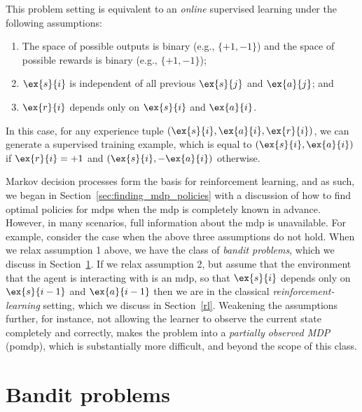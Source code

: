 This problem setting is equivalent to an {\em online} supervised
learning under the following assumptions:
\begin{enumerate}
\item The space of possible outputs is binary
(e.g., $\{+1, -1\}$) and the space of possible rewards is binary
(e.g., $\{+1, -1\}$); 
\item $\ex{s}{i}$ is independent of all previous $\ex{s}{j}$ and
  $\ex{a}{j}$; and
\item $\ex{r}{i}$ depends only on $\ex{s}{i}$ and $\ex{a}{i}$.  
\end{enumerate}
In this
case, for any experience tuple $(\ex{s}{i}, \ex{a}{i}, \ex{r}{i})$, we
can generate a supervised training example, which is equal to
$(\ex{s}{i}, \ex{a}{i})$ if $\ex{r}{i} = +1$ and $(\ex{s}{i},
-\ex{a}{i})$ otherwise.

Markov decision processes form the basis for reinforcement learning,
and as such, we began in Section~\ref{sec:finding_mdp_policies} with a
discussion of how to find optimal policies for {\sc mdp}s when the
{\sc mdp} is completely known in advance.  However, in many
scenarios, full information about the
{\sc mdp} is unavailable.  For example, consider the case when the above
three assumptions do not hold.  When we relax assumption 1 above, we
have the class of {\em bandit problems}, which we discuss in
Section~\ref{bandit}.  If we relax assumption 2, but assume that the
environment that the agent is interacting with is an {\sc mdp}, so
that $\ex{s}{i}$ depends only on $\ex{s}{i-1}$ and $\ex{a}{i-1}$ then
we are in the classical {\em reinforcement-learning} setting, which we
discuss in Section~\ref{rl}.  Weakening the assumptions further, for
instance, not allowing the learner to observe the current state
completely and correctly, makes the problem into a {\em partially
  observed MDP} ({\sc pomdp}), which is substantially more difficult,
and beyond the scope of this class.


\section{Bandit problems}
\label{bandit}


